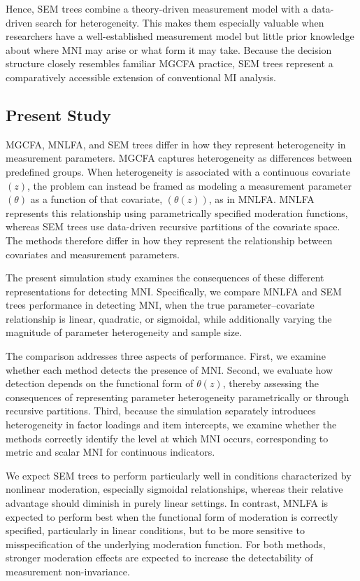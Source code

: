 \documentclass[
  man,
  floatsintext]{apa7}
\begin{document}
Hence, SEM trees combine a theory-driven measurement model with a
data-driven search for heterogeneity. This makes them especially
valuable when researchers have a well-established measurement model but
little prior knowledge about where MNI may arise or what form it may
take. Because the decision structure closely resembles familiar MGCFA
practice, SEM trees represent a comparatively accessible extension of
conventional MI analysis.

\subsection{Present Study}\label{present-study}

MGCFA, MNLFA, and SEM trees differ in how they represent heterogeneity
in measurement parameters. MGCFA captures heterogeneity as differences
between predefined groups. When heterogeneity is associated with a
continuous covariate \((z)\), the problem can instead be framed as
modeling a measurement parameter \((\theta)\) as a function of that
covariate, \((\theta(z))\), as in MNLFA. MNLFA represents this
relationship using parametrically specified moderation functions,
whereas SEM trees use data-driven recursive partitions of the covariate
space. The methods therefore differ in how they represent the
relationship between covariates and measurement parameters.

The present simulation study examines the consequences of these
different representations for detecting MNI. Specifically, we compare
MNLFA and SEM trees performance in detecting MNI, when the true
parameter--covariate relationship is linear, quadratic, or sigmoidal,
while additionally varying the magnitude of parameter heterogeneity and
sample size.

The comparison addresses three aspects of performance. First, we examine
whether each method detects the presence of MNI. Second, we evaluate how
detection depends on the functional form of \(\theta(z)\), thereby
assessing the consequences of representing parameter heterogeneity
parametrically or through recursive partitions. Third, because the
simulation separately introduces heterogeneity in factor loadings and
item intercepts, we examine whether the methods correctly identify the
level at which MNI occurs, corresponding to metric and scalar MNI for
continuous indicators.

We expect SEM trees to perform particularly well in conditions
characterized by nonlinear moderation, especially sigmoidal
relationships, whereas their relative advantage should diminish in
purely linear settings. In contrast, MNLFA is expected to perform best
when the functional form of moderation is correctly specified,
particularly in linear conditions, but to be more sensitive to
misspecification of the underlying moderation function. For both
methods, stronger moderation effects are expected to increase the
detectability of measurement non-invariance.
\end{document}
